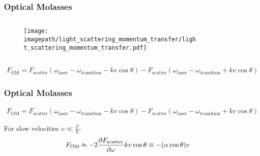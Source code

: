 \begin{frame}
    \frametitle{Optical Molasses}
    \begin{columns}
        \onslide<+->
        \begin{column}[]{0.48\textwidth}
            \begin{figure}
                \texttt{[image: \\imagepath/light\_scattering\_momentum\_transfer/light\_scattering\_momentum\_transfer.pdf]}
            \end{figure}
        \end{column}
        
        \onslide<+->
        \begin{column}[]{0.48\textwidth}
            \begin{figure}
                \scalebox{0.7}{
                    \begin{pgfpicture}
                        \pgftext{}
                    \end{pgfpicture}
                }
            \end{figure}
        \end{column}
\end{columns}

\onslide<+->
\begin{align*}
    F_\mathrm{OM} = F_\mathrm{scatter}(\omega_\mathrm{laser} - \omega_\mathrm{transition} - kv \cos \theta) - F_\mathrm{scatter}(\omega_\mathrm{laser} - \omega_\mathrm{transition} + kv \cos \theta)
\end{align*}

\end{frame}

\begin{frame}
    \frametitle{Optical Molasses}
    \begin{align*}
        F_\mathrm{OM} = F_\mathrm{scatter}(\omega_\mathrm{laser} - \omega_\mathrm{transition} - kv \cos \theta) - F_\mathrm{scatter}(\omega_\mathrm{laser} - \omega_\mathrm{transition} + kv \cos \theta)
    \end{align*}
    
    For slow velocities $v \ll \frac{\Gamma}{k}$:
    \begin{equation*}
            F_\mathrm{OM} \approx - 2 \pdv{F_\mathrm{scatter}}{\omega} k v \cos \theta \equiv -( \alpha \cos \theta) v
    \end{equation*}
\end{frame}


